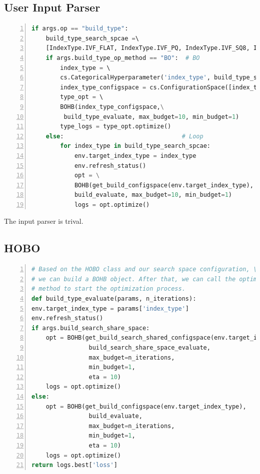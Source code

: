 \documentclass{ol-softwaremanual}
\begin{document}
\subsection{User Input Parser}
\begin{lstlisting}[language=python,numbers=left,basicstyle=\footnotesize, caption={Input Parser}]
if args.op == "build_type":
    build_type_search_spcae =\ 
    [IndexType.IVF_FLAT, IndexType.IVF_PQ, IndexType.IVF_SQ8, IndexType.HNSW]
    if args.build_type_op_method == "BO":  # BO
        index_type = \ 
        cs.CategoricalHyperparameter('index_type', build_type_search_spcae)
        index_type_configspace = cs.ConfigurationSpace([index_type], seed=123)
        type_opt = \ 
        BOHB(index_type_configspace,\
         build_type_evaluate, max_budget=10, min_budget=1)
        type_logs = type_opt.optimize()
    else:                                 # Loop
        for index_type in build_type_search_spcae:
            env.target_index_type = index_type
            env.refresh_status()
            opt = \
            BOHB(get_build_configspace(env.target_index_type), \ 
            build_evaluate, max_budget=10, min_budget=1)
            logs = opt.optimize()
\end{lstlisting}

The input parser is trival.

\newpage
\subsection{HOBO}
\begin{lstlisting}[language=python,numbers=left,basicstyle=\footnotesize, caption={HOBO}]
# Based on the HOBO class and our search space configuration, \ 
# we can build a BOHB object. After that, we can call the optimize() \ 
# method to start the optimization process.
def build_type_evaluate(params, n_iterations):
env.target_index_type = params['index_type']
env.refresh_status()
if args.build_search_share_space:
    opt = BOHB(get_build_search_shared_configspace(env.target_index_type),  
                build_search_share_space_evaluate, 
                max_budget=n_iterations, 
                min_budget=1, 
                eta = 10)
    logs = opt.optimize()
else:
    opt = BOHB(get_build_configspace(env.target_index_type), 
                build_evaluate, 
                max_budget=n_iterations, 
                min_budget=1,  
                eta = 10)
    logs = opt.optimize()
return logs.best['loss']
\end{lstlisting}
\end{document}
